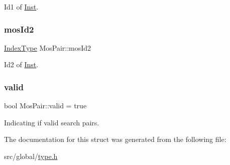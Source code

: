 Id1 of \hyperlink{classInst}{Inst}. \mbox{\label{structMosPair_ad7532ebe9956affecef77d009bcf120f}} 
\subsubsection{\texorpdfstring{mos\+Id2}{mosId2}}
{\footnotesize\ttfamily \hyperlink{type_8h_a581e8093e28e7362f2b6937296190676}{Index\+Type} Mos\+Pair\+::mos\+Id2}

Id2 of \hyperlink{classInst}{Inst}. \mbox{\label{structMosPair_ab43ac4352b3f0c9db37063a7742c4884}} 
\subsubsection{\texorpdfstring{valid}{valid}}
{\footnotesize\ttfamily bool Mos\+Pair\+::valid = true}

Indicating if valid search pairs. 

The documentation for this struct was generated from the following file\+:\begin{DoxyCompactItemize}
\item 
src/global/\hyperlink{type_8h}{type.\+h}\end{DoxyCompactItemize}
